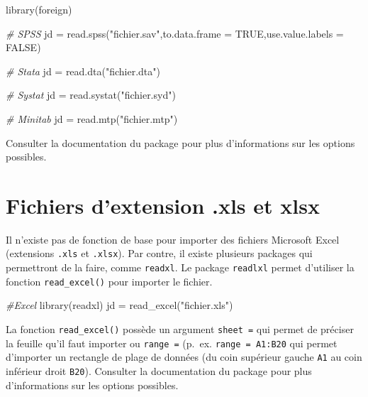 \documentclass[
]{book}
\newenvironment{Shaded}{}{}
\newcommand{\AttributeTok}[1]{#1}
\newcommand{\CommentTok}[1]{\textit{#1}}
\newcommand{\ConstantTok}[1]{#1}
\newcommand{\FunctionTok}[1]{#1}
\newcommand{\NormalTok}[1]{#1}
\newcommand{\OtherTok}[1]{#1}
\newcommand{\StringTok}[1]{#1}
\begin{document}
\begin{Shaded}
\begin{Highlighting}[]
\FunctionTok{library}\NormalTok{(foreign)}

\CommentTok{\# SPSS}
\NormalTok{jd }\OtherTok{=} \FunctionTok{read.spss}\NormalTok{(}\StringTok{"fichier.sav"}\NormalTok{,}\AttributeTok{to.data.frame =} \ConstantTok{TRUE}\NormalTok{,}\AttributeTok{use.value.labels =} \ConstantTok{FALSE}\NormalTok{)}

\CommentTok{\# Stata}
\NormalTok{jd }\OtherTok{=} \FunctionTok{read.dta}\NormalTok{(}\StringTok{"fichier.dta"}\NormalTok{)}

\CommentTok{\# Systat}
\NormalTok{jd }\OtherTok{=} \FunctionTok{read.systat}\NormalTok{(}\StringTok{"fichier.syd"}\NormalTok{) }

\CommentTok{\# Minitab}
\NormalTok{jd }\OtherTok{=} \FunctionTok{read.mtp}\NormalTok{(}\StringTok{"fichier.mtp"}\NormalTok{)}
\end{Highlighting}
\end{Shaded}

Consulter la documentation du package pour plus d'informations sur les options possibles.

\hypertarget{fichiers-dextension-.xls-et-xlsx}{%
\section{Fichiers d'extension .xls et xlsx}\label{fichiers-dextension-.xls-et-xlsx}}

Il n'existe pas de fonction de base pour importer des fichiers Microsoft Excel (extensions \texttt{.xls} et \texttt{.xlsx}). Par contre, il existe plusieurs packages qui permettront de la faire, comme \texttt{readxl}. Le package \texttt{readlxl} permet d'utiliser la fonction \texttt{read\_excel()} pour importer le fichier.

\begin{Shaded}
\begin{Highlighting}[]
\CommentTok{\#Excel}
\FunctionTok{library}\NormalTok{(readxl)}
\NormalTok{jd }\OtherTok{=} \FunctionTok{read\_excel}\NormalTok{(}\StringTok{"fichier.xls"}\NormalTok{)}
\end{Highlighting}
\end{Shaded}

La fonction \texttt{read\_excel()} possède un argument \texttt{sheet\ =} qui permet de préciser la feuille qu'il faut importer ou \texttt{range\ =} (p.~ex. \texttt{range\ =\ A1:B20} qui permet d'importer un rectangle de plage de données (du coin supérieur gauche \texttt{A1} au coin inférieur droit \texttt{B20}).
Consulter la documentation du package pour plus d'informations sur les options possibles.
\end{document}
